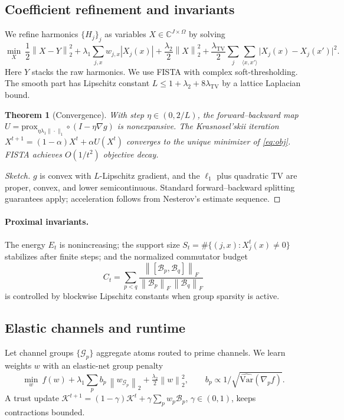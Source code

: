 \documentclass[11pt]{article}
\newtheorem{theorem}{Theorem}
\newcommand{\C}{\mathbb{C}}
\newcommand{\norm}[1]{\left\lVert #1 \right\rVert}
\begin{document}
\subsection{Coefficient refinement and invariants}
We refine harmonics $\{H_j\}_j$ as variables $X\in\C^{J\times\Omega}$ by solving
\begin{equation}\label{eq:obj}
\min_{X}\ \frac{1}{2}\norm{X-Y}_2^2 + \lambda_1\sum_{j,x} w_{j,x}|X_{j}(x)| + \frac{\lambda_2}{2}\norm{X}_2^2 + \frac{\lambda_{\mathrm{TV}}}{2}\sum_{j}\!\sum_{\langle x,x'\rangle}\!\bigl|X_j(x)-X_j(x')\bigr|^2.
\end{equation}
Here $Y$ stacks the raw harmonics. We use FISTA with complex soft-thresholding. The smooth part has Lipschitz constant $L\le 1+\lambda_2+8\lambda_{\mathrm{TV}}$ by a lattice Laplacian bound.

\begin{theorem}[Convergence]
With step $\eta\in(0,2/L)$, the forward–backward map $U=\mathrm{prox}_{\eta \lambda_1\|\cdot\|_1}\!\circ(I-\eta\nabla g)$ is nonexpansive. The Krasnosel'skii iteration $X^{t+1}=(1-\alpha)X^t+\alpha U(X^t)$ converges to the unique minimizer of \eqref{eq:obj}. FISTA achieves $O(1/t^2)$ objective decay.
\end{theorem}
\begin{proof}[Sketch]
$g$ is convex with $L$-Lipschitz gradient, and the $\ell_1$ plus quadratic TV are proper, convex, and lower semicontinuous. Standard forward–backward splitting guarantees apply; acceleration follows from Nesterov's estimate sequence.
\end{proof}

\paragraph{Proximal invariants.} The energy $E_t$ is nonincreasing; the support size $S_t=\#\{(j,x):X^t_j(x)\neq 0\}$ stabilizes after finite steps; and the normalized commutator budget
\begin{equation}
 C_t = \sum_{p<q} \frac{\norm{[\mathcal{B}_p,\mathcal{B}_q]}_F}{\norm{\mathcal{B}_p}_F\,\norm{\mathcal{B}_q}_F}
\end{equation}
is controlled by blockwise Lipschitz constants when group sparsity is active.

\subsection{Elastic channels and runtime}
Let channel groups $\{\mathcal{G}_p\}$ aggregate atoms routed to prime channels. We learn weights $w$ with an elastic-net group penalty
\begin{equation}
\min_w\ f(w)+\lambda_1\sum_p b_p\,\norm{w_{\mathcal{G}_p}}_2+\tfrac{\lambda_2}{2}\norm{w}_2^2,\qquad b_p\propto 1/\sqrt{\widehat{\mathrm{Var}}(\nabla_p f)}.
\end{equation}
A trust update $\mathcal{K}^{t+1}=(1-\gamma)\mathcal{K}^t+\gamma\sum_p w_p\mathcal{B}_p$, $\gamma\in(0,1)$, keeps contractions bounded.
\end{document}
